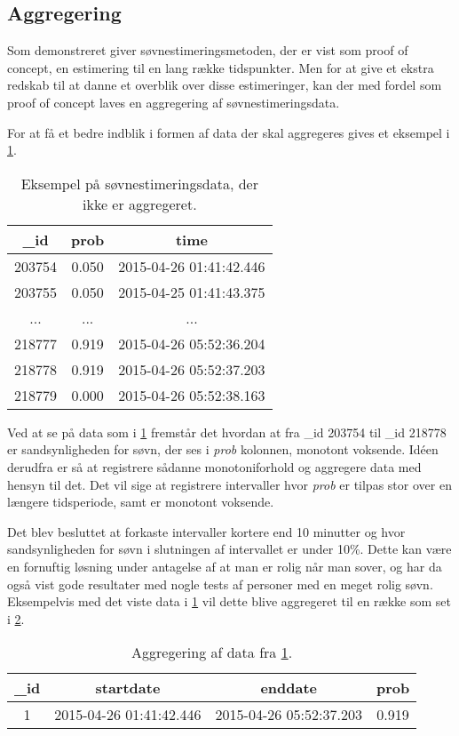 \subsection{Aggregering}\label{subsec:soevnaggre}
Som demonstreret giver søvnestimeringsmetoden, der er vist som proof of concept, en estimering til en lang række tidspunkter.
Men for at give et ekstra redskab til at danne et overblik over disse estimeringer, kan der med fordel som proof of concept laves en aggregering af søvnestimeringsdata.

For at få et bedre indblik i formen af data der skal aggregeres gives et eksempel i \cref{tab:noaggsoevndata}.
\begin{table}[h]
	\centering
\begin{tabular}{|c|c|c|}
	\hline {\_}id & prob & time \\ 
	\hline 203754 & 0.050 & 2015-04-26 01:41:42.446 \\ 
	\hline 203755 & 0.050 & 2015-04-25 01:41:43.375 \\ 
	\hline ... & ... & ... \\ 
	\hline 218777 & 0.919 & 2015-04-26 05:52:36.204 \\ 
	\hline 218778 & 0.919 & 2015-04-26 05:52:37.203 \\ 
	\hline 218779 & 0.000 & 2015-04-26 05:52:38.163 \\ 
	\hline 
\end{tabular}
\caption{Eksempel på søvnestimeringsdata, der ikke er aggregeret.}\label{tab:noaggsoevndata}
\end{table}
Ved at se på data som i \cref{tab:noaggsoevndata} fremstår det hvordan at fra {\_}id 203754 til {\_}id 218778 er sandsynligheden for søvn, der ses i \textit{prob} kolonnen, monotont voksende.
Idéen derudfra er så at registrere sådanne monotoniforhold og aggregere data med hensyn til det.
Det vil sige at registrere intervaller hvor \textit{prob} er tilpas stor over en længere tidsperiode, samt er monotont voksende.

Det blev besluttet at forkaste intervaller kortere end 10 minutter og hvor sandsynligheden for søvn i slutningen af intervallet er under 10\%.
Dette kan være en fornuftig løsning under antagelse af at man er rolig når man sover, og har da også vist gode resultater med nogle tests af personer med en meget rolig søvn. 
Eksempelvis med det viste data i \cref{tab:noaggsoevndata} vil dette blive aggregeret til en række som set i \cref{tab:aggdat}.

\begin{table}[h]
	\centering
\begin{tabular}{|c|c|c|c|}
	\hline {\_}id & startdate & enddate & prob \\ 
	\hline 1 & 2015-04-26 01:41:42.446 &  2015-04-26 05:52:37.203 & 0.919 \\ 
	\hline 
\end{tabular} 
\caption{Aggregering af data fra \cref{tab:noaggsoevndata}.}\label{tab:aggdat}
\end{table}

